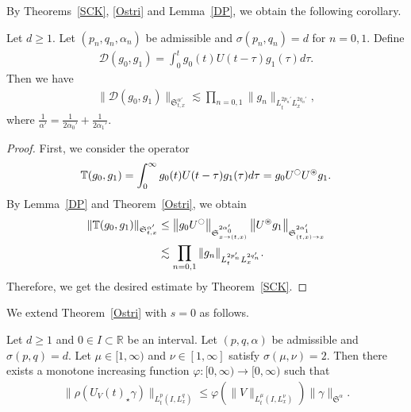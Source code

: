 \documentclass[10pt,a4paper]{amsart}
\newcommand{\oast}{\circledast}
\newcommand{\BT}{\mathbb{T}}
\newcommand{\CD}{\mathcal{D}}
\newcommand{\FS}{\mathfrak{S}}
\newcommand{\al}{\alpha}
\newcommand{\ga}{\gamma}
\newcommand{\ph}{\varphi}
\newcommand{\ta}{\tau}
\newcommand{\si}{\sigma}
\newcommand{\rh}{\rho}
\newcommand{\I}{\infty}
\newcommand{\tx}{{t,x}}
\newcommand{\st}{\star}
\newcommand{\R}{\mathbb{R}}
\newcommand{\oc}{\ocircle}
\newcommand{\os}{\oast}
\newcommand{\ls}{\lesssim}
\begin{document}
By Theorems~\ref{SCK}, \ref{Ostri} and Lemma~\ref{DP}, we obtain the following corollary.

\begin{coro}\label{DS}
Let $d \geq 1$. Let $(p_n,q_n,\al_n)$ be admissible and $\si(p_n,q_n)=d$ for $n = 0,1$. Define
\begin{align}
\CD(g_0,g_1) = \int_0^t g_0(t)U(t-\ta)g_1(\ta)d\ta.
\end{align}
Then we have
\begin{align}
\|\CD(g_0,g_1)\|_{\FS^{\al'}_{t,x}} \ls \prod_{n=0,1} \|g_n\|_{L^{2p_n'}_t L^{2q_n'}_x},
\end{align}
where $\frac{1}{\al'} = \frac{1}{2\al_0'} + \frac{1}{2\al_1'}$.
\end{coro}

\begin{proof}
First, we consider the operator
\begin{align}
\BT(g_0,g_1) = \int_0^\I g_0(t)U(t-\ta)g_1(\ta)d\ta = g_0 U^\oc U^\os g_1.
\end{align}
By Lemma~\ref{DP} and Theorem~\ref{Ostri}, we obtain
\begin{align}
\left\|\BT(g_0,g_1)\right\|_{\FS^{\al'}_{\tx}} &\le \left\|g_0 U^\oc\right\|_{\FS^{2\al_0'}_{x \to (\tx)}} \left\|U^\os g_1\right\|_{\FS^{2\al_1'}_{(\tx)\to x}} \\
&\ls \prod_{n=0,1} \|g_n\|_{L^{2p_n'}_t L^{2q_n'}_x}.
\end{align}
Therefore, we get the desired estimate by Theorem~\ref{SCK}.
\end{proof}

We extend Theorem~\ref{Ostri} with $s=0$ as follows.

\begin{lemm}\label{U_V-U}
Let $d\geq 1$ and $0 \in I \subset \R$ be an interval. Let $(p,q,\al)$ be admissible and $\si(p,q)=d$. Let $\mu \in [1, \I)$ and $\nu \in [1, \I]$ satisfy $\si(\mu,\nu)=2$. Then there exists a monotone increasing function $\ph:[0,\I) \to [0,\I)$ such that
\begin{align}\label{U_V-U est}
\|\rh(U_V(t)_\st \ga)\|_{L^p_t(I,L^q_x)} \le \ph\left(\|V\|_{L^\mu_t(I,L^\nu_x)}\right) \|\ga\|_{\FS^\al}.
\end{align}
\end{lemm}
\end{document}
